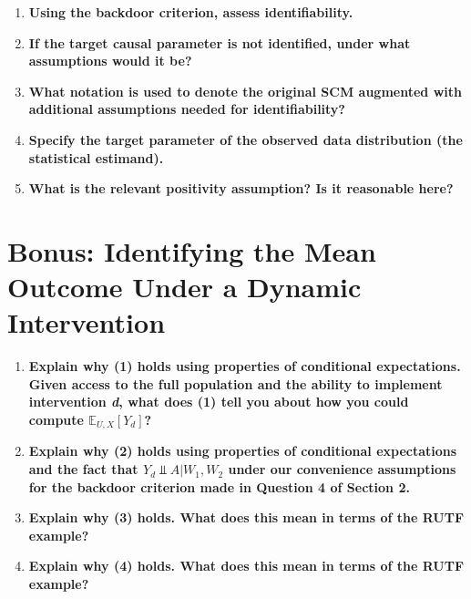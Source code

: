 \documentclass{article}\usepackage[]{graphicx}\usepackage[]{xcolor}
\begin{document}
  \begin{enumerate}[label=\textbf{\alph*.}]
  
    \item \textbf{Using the backdoor criterion, assess identifiability.}
    
    \item \textbf{If the target causal parameter is not identified, under what assumptions would it be?}
    
    \item \textbf{What notation is used to denote the original SCM augmented with additional assumptions needed for identifiability?}
    
    \item \textbf{Specify the target parameter of the observed data distribution (the statistical estimand).}
    
    \item \textbf{What is the relevant positivity assumption? Is it reasonable here?}
  
  \end{enumerate}
  
\pagebreak

\section{Bonus: Identifying the Mean Outcome Under a Dynamic Intervention}

\begin{enumerate}[label=\textbf{\arabic*.}]
  
  \item \textbf{Explain why (1) holds using properties of conditional expectations. Given access to the full population and the ability to implement intervention \textit{d}, what does (1) tell you about how you could compute $\mathbb{E}_{U,X}[Y_d]$?}
  
  \item \textbf{Explain why (2) holds using properties of conditional expectations and the fact that $Y_d \Perp A|W_1, W_2$ under our convenience assumptions for the backdoor criterion made in Question 4 of Section 2.}
  
  \item \textbf{Explain why (3) holds. What does this mean in terms of the RUTF example?}
  
  \item \textbf{Explain why (4) holds. What does this mean in terms of the RUTF example?}
  
\end{enumerate}
\end{document}
